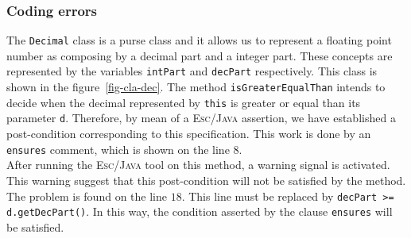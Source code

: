 \documentclass[a4paper]{llncs}
\begin{document}
\subsubsection{Coding errors}
The \texttt{Decimal} class is a purse class and it allows us to
represent a floating point number as
composing by a decimal part and a integer part. These concepts are
represented by the variables \texttt{intPart} and \texttt{decPart}
respectively. This class is shown in the figure~\ref{fig-cla-dec}. The
method \texttt{isGreaterEqualThan} intends to decide when the decimal
represented by \texttt{this} is greater or equal than its parameter
\texttt{d}. Therefore, by mean of a \textsc{Esc/Java} assertion, we
have established a post-condition corresponding to this
specification. This work is done by an \texttt{ensures} comment, which
is shown on the line $8$. \\

After running the \textsc{Esc/Java} tool on this method, a warning
signal is activated. This warning suggest that this post-condition
will not be satisfied by the method. The problem is found on the line
$18$. This line must be replaced by \texttt{decPart >=
d.getDecPart()}. In this way, the condition asserted by the clause
\texttt{ensures} will be satisfied.
\end{document}
